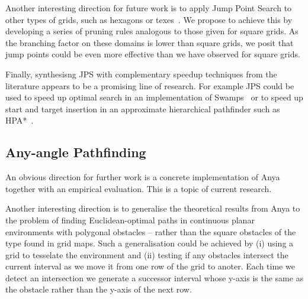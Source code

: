 Another interesting direction for future work is to apply Jump Point Search 
to other types of grids, such as hexagons or texes~\citep{yap02}. We propose
to achieve this by developing  a series of pruning rules analogous to those
given for square grids.  As the branching factor on these domains is lower
than square grids, we posit that jump points could be even more effective 
than we have observed for square grids.

Finally, synthesisng JPS with complementary speedup techniques from the
literature appears to be a promising line of research. For example JPS could
be used to speed up optimal search in an implementation of
Swamps~\citep{pochter08} or to speed up start and target insertion in an
approximate hierarchical pathfinder such as HPA{*}~\citep{botea04}.

\subsection{Any-angle Pathfinding}
An obvious direction for further work is a concrete implementation of Anya
together with an empirical evaluation. This is a topic of current research.

Another interesting direction is to generalise the theoretical results from
Anya to the problem of finding Euclidean-optimal paths in continuous planar
environments with polygonal obstacles -- rather than the square obstacles of
the type found in grid maps. Such a generalisation could be achieved by (i) 
using a grid to tesselate the environment and (ii) testing if any obstacles
intersect the current interval as we move it from one row of the grid to anoter.
Each time we detect an intersection we generate a successor interval whose y-axis
is the same as the obstacle rather than the y-axis of the next row.
